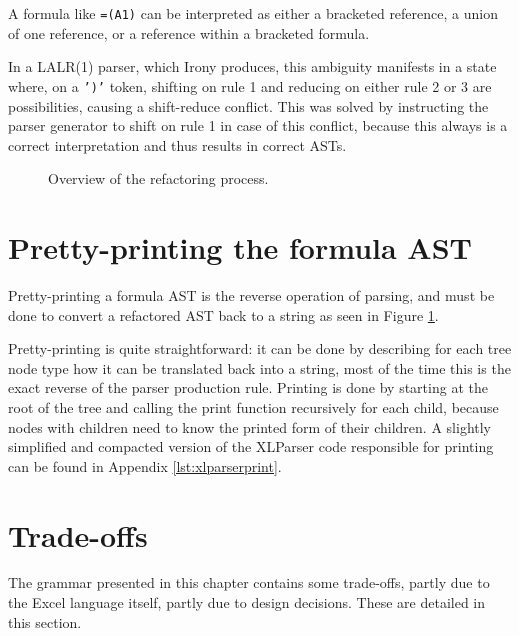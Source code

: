 A formula like \texttt{=(A1)} can be interpreted as either a bracketed reference, a union of one reference, or a reference within a bracketed formula.

In a LALR(1) parser, which Irony produces, this ambiguity manifests in a state where, on a \texttt{')'} token, shifting on rule 1 and reducing on either rule 2 or 3 are possibilities, causing a shift-reduce conflict.
This was solved by instructing the parser generator to shift on rule 1 in case of this conflict, because this always is a correct interpretation and thus results in correct ASTs.

\newpage

\noindent
\begin{figure}[h!]
	\hspace*{0.003\textwidth}
	
	\caption{Overview of the refactoring process.}
	\label{fig:chapterparsingintrofigure}
\end{figure}

\section{Pretty-printing the formula AST}
\label{sec:printing}

Pretty-printing a formula AST is the reverse operation of parsing, and must be done to convert a refactored AST back to a string as seen in Figure \ref{fig:chapterparsingintrofigure}.

Pretty-printing is quite straightforward: it can be done by describing for each tree node type how it can be translated back into a string, most of the time this is the exact reverse of the parser production rule.
Printing is done by starting at the root of the tree and calling the print function recursively for each child, because nodes with children need to know the printed form of their children.
A slightly simplified and compacted version of the XLParser code responsible for printing can be found in Appendix \ref{lst:xlparserprint}.

\section{Trade-offs}

The grammar presented in this chapter contains some trade-offs, partly due to the Excel language itself, partly due to design decisions.
These are detailed in this section.

